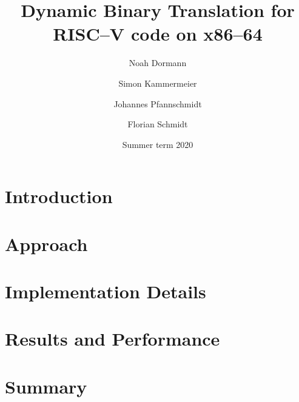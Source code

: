 \documentclass[course=eragp]{aspdoc}
\author{Noah Dormann \and Simon Kammermeier \and Johannes Pfannschmidt \and Florian Schmidt}
\date{Summer term 2020}
\title{Dynamic Binary Translation for RISC--V code on x86--64}
\begin{document}
\maketitle
\tableofcontents
\pagebreak


\section{Introduction}


\section{Approach}


\section{Implementation Details}


\section{Results and Performance}


\section{Summary}



{}

\end{document}
